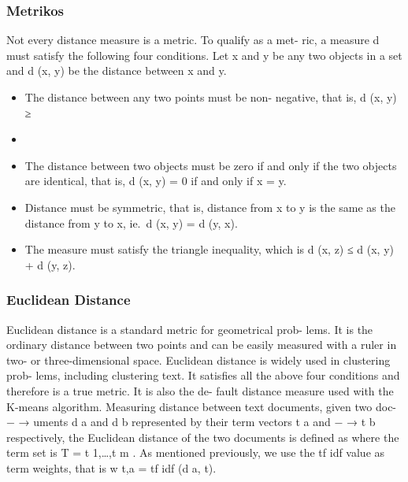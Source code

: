 \documentclass{VUMIFInfKursinis}
\begin{document}
		\subsubsection{Metrikos}
		Not every distance measure is a metric. To qualify as a met- ric, a measure d must satisfy the following four conditions.  Let x and y be any two objects in a set and d (x, y) be the distance between x and y.
		\begin{itemize}
			\item The distance between any two points must be non- negative, that is, d (x, y) ≥ \item
			\item The distance between two objects must be zero if and only if the two objects are identical, that is, d (x, y) = 0 if and only if x = y.
			\item Distance must be symmetric, that is, distance from x to y is the same as the distance from y to x, ie.\  d (x, y) = d (y, x).
			\item The measure must satisfy the triangle inequality, which is d (x, z) ≤ d (x, y) + d (y, z).
		\end{itemize}

		\subsubsection{Euclidean Distance}
			Euclidean distance is a standard metric for geometrical prob- lems. It is the ordinary distance between two points and can be easily measured with a ruler in two- or three-dimensional space. Euclidean distance is widely used in clustering prob- lems, including clustering text. It satisfies all the above four conditions and therefore is a true metric. It is also the de- fault distance measure used with the K-means algorithm.
			Measuring distance between text documents, given two doc- − → uments d a and d b represented by their term vectors t a and − → t b respectively, the Euclidean distance of the two documents is defined as
			where the term set is T = {t 1,\ldots,t m }. As mentioned previously, we use the tf idf value as term weights, that is w t,a = tf idf (d a, t).
\end{document}

